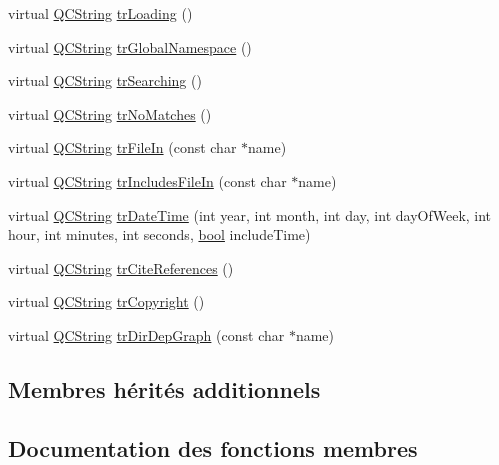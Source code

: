 \begin{DoxyCompactItemize}
\item 
virtual \hyperlink{class_q_c_string}{Q\+C\+String} \hyperlink{class_translator_armenian_af75078cf1f25d5e91c79a9ab62ea1ac6}{tr\+Loading} ()
\item 
virtual \hyperlink{class_q_c_string}{Q\+C\+String} \hyperlink{class_translator_armenian_a718905c6683f767993fb42ff2fb86107}{tr\+Global\+Namespace} ()
\item 
virtual \hyperlink{class_q_c_string}{Q\+C\+String} \hyperlink{class_translator_armenian_a352005ced78b82da4bd96c626bb1fc4e}{tr\+Searching} ()
\item 
virtual \hyperlink{class_q_c_string}{Q\+C\+String} \hyperlink{class_translator_armenian_af16ff10c1579eeaed8643b654223b59e}{tr\+No\+Matches} ()
\item 
virtual \hyperlink{class_q_c_string}{Q\+C\+String} \hyperlink{class_translator_armenian_af5d985e19a1226edad471f71af530275}{tr\+File\+In} (const char $\ast$name)
\item 
virtual \hyperlink{class_q_c_string}{Q\+C\+String} \hyperlink{class_translator_armenian_af2a4a618cdf3af2ac4be6779c2b79896}{tr\+Includes\+File\+In} (const char $\ast$name)
\item 
virtual \hyperlink{class_q_c_string}{Q\+C\+String} \hyperlink{class_translator_armenian_a6281ed0a3cf72b694c837c8153136baa}{tr\+Date\+Time} (int year, int month, int day, int day\+Of\+Week, int hour, int minutes, int seconds, \hyperlink{qglobal_8h_a1062901a7428fdd9c7f180f5e01ea056}{bool} include\+Time)
\item 
virtual \hyperlink{class_q_c_string}{Q\+C\+String} \hyperlink{class_translator_armenian_a26da4084271759771361792d43a91d11}{tr\+Cite\+References} ()
\item 
virtual \hyperlink{class_q_c_string}{Q\+C\+String} \hyperlink{class_translator_armenian_a3556a8b0bd648ff9659540c1e2d3003e}{tr\+Copyright} ()
\item 
virtual \hyperlink{class_q_c_string}{Q\+C\+String} \hyperlink{class_translator_armenian_a8ce2837746d4329f149e0d94a1b3cf76}{tr\+Dir\+Dep\+Graph} (const char $\ast$name)
\end{DoxyCompactItemize}
\subsection*{Membres hérités additionnels}


\subsection{Documentation des fonctions membres}
\hypertarget{class_translator_armenian_a71f58cc43e701c54540c1525bd96aa71}{}
